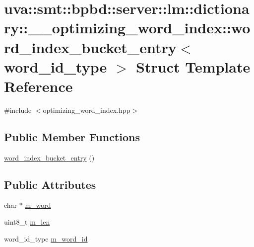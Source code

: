 \hypertarget{structuva_1_1smt_1_1bpbd_1_1server_1_1lm_1_1dictionary_1_1____optimizing__word__index_1_1word__index__bucket__entry}{}\section{uva\+:\+:smt\+:\+:bpbd\+:\+:server\+:\+:lm\+:\+:dictionary\+:\+:\+\_\+\+\_\+optimizing\+\_\+word\+\_\+index\+:\+:word\+\_\+index\+\_\+bucket\+\_\+entry$<$ word\+\_\+id\+\_\+type $>$ Struct Template Reference}
\label{structuva_1_1smt_1_1bpbd_1_1server_1_1lm_1_1dictionary_1_1____optimizing__word__index_1_1word__index__bucket__entry}


{\ttfamily \#include $<$optimizing\+\_\+word\+\_\+index.\+hpp$>$}

\subsection*{Public Member Functions}
\begin{DoxyCompactItemize}
\item 
\hyperlink{structuva_1_1smt_1_1bpbd_1_1server_1_1lm_1_1dictionary_1_1____optimizing__word__index_1_1word__index__bucket__entry_ae8ea03fab122353339a630ccb446326f}{word\+\_\+index\+\_\+bucket\+\_\+entry} ()
\end{DoxyCompactItemize}
\subsection*{Public Attributes}
\begin{DoxyCompactItemize}
\item 
char $\ast$ \hyperlink{structuva_1_1smt_1_1bpbd_1_1server_1_1lm_1_1dictionary_1_1____optimizing__word__index_1_1word__index__bucket__entry_a3eed73a042cf4250d82892ce3c714d3f}{m\+\_\+word}
\item 
uint8\+\_\+t \hyperlink{structuva_1_1smt_1_1bpbd_1_1server_1_1lm_1_1dictionary_1_1____optimizing__word__index_1_1word__index__bucket__entry_add444b47af51c2caf61693e2392165d2}{m\+\_\+len}
\item 
word\+\_\+id\+\_\+type \hyperlink{structuva_1_1smt_1_1bpbd_1_1server_1_1lm_1_1dictionary_1_1____optimizing__word__index_1_1word__index__bucket__entry_a51dbc0341037d8ef0059b18dad893ba1}{m\+\_\+word\+\_\+id}
\end{DoxyCompactItemize}


